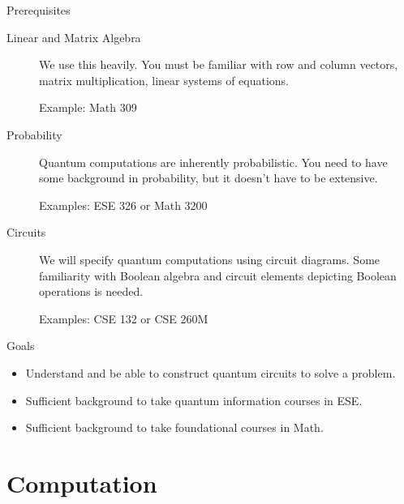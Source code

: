 \begin{frame}{Prerequisites}
\begin{description}
    \item[Linear and Matrix Algebra] We use this heavily.  You must be familiar with row and column vectors, matrix multiplication, linear systems of equations.
    
    Example:  Math 309
    \item[Probability] Quantum computations are inherently probabilistic.  You need to have some background in probability, but it doesn't have to be extensive.
    
    Examples:  ESE 326 or Math 3200
    \item[Circuits]  We will specify quantum computations using circuit diagrams.  Some familiarity with Boolean algebra and circuit elements depicting Boolean operations is needed.
    
    Examples:  CSE 132 or CSE 260M
\end{description}
\end{frame}
\begin{frame}{Goals}
\begin{itemize}
    \item Understand and be able to construct quantum circuits to solve a problem.
    \item Sufficient background to take quantum information courses in ESE.
    \item Sufficient background to take foundational courses in Math.
\end{itemize}
\end{frame}


\section{Computation}

